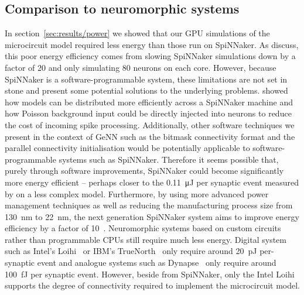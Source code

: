 \documentclass[utf8]{frontiersSCNS} %
\begin{document}
\subsection{Comparison to neuromorphic systems}
In section~\ref{sec:results/power} we showed that our GPU simulations of the microcircuit model required less energy than those run on SpiNNaker.
As \citeauthor{VanAlbada2018} discuss, this poor energy efficiency comes from slowing SpiNNaker simulations down by a factor of \num{20} and only simulating \num{80} neurons on each core.
However, because SpiNNaker is a software-programmable system, these limitations are not set in stone and \citet{Knight2016b} present some potential solutions to the underlying problems.
\citeauthor{Knight2016b} showed how models can be distributed more efficiently across a SpiNNaker machine and how Poisson background input could be directly injected into neurons to reduce the cost of incoming spike processing.
Additionally, other software techniques we present in the context of GeNN such as the bitmask connectivity format and the parallel connectivity initialisation would be potentially applicable to software-programmable systems such as SpiNNaker.
Therefore it seems possible that, purely through software improvements, SpiNNaker could become significantly more energy efficient -- perhaps closer to the \SI{0.11}{\micro\joule} per synaptic event measured by \citet{Sharp2012} on a less complex model.
Furthermore, by using more advanced power management techniques as well as reducing the manufacturing process size from \SI{130}{\nano\metre} to \SI{22}{\nano\meter}, the next generation SpiNNaker system aims to improve energy efficiency by a factor of \num{10}~\citep{Hoppner2017}.
Neuromorphic systems based on custom circuits rather than programmable CPUs still require much less energy.
Digital system such as Intel's Loihi~\citep{Davies2018} or IBM's TrueNorth~\citep{Merolla2014} only require around \SI{20}{\pico\joule} per-synaptic event and analogue systems such as Dynapse~\citep{Qiao2015} only require around \SI{100}{\femto\joule} per synaptic event.
However, beside from SpiNNaker, only the Intel Loihi supports the degree of connectivity required to implement the microcircuit model.
\end{document}
